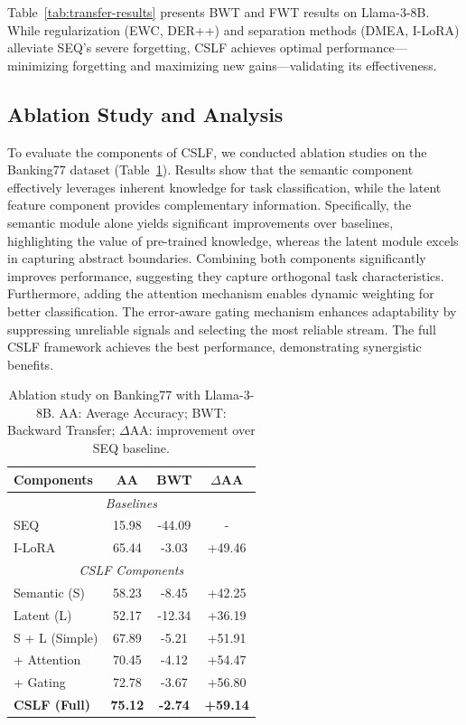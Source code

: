 \documentclass[11pt]{article}
\begin{document}
Table~\ref{tab:transfer-results} presents BWT and FWT results on Llama-3-8B. While regularization (EWC, DER++) and separation methods (DMEA, I-LoRA) alleviate SEQ's severe forgetting, CSLF achieves optimal performance—minimizing forgetting and maximizing new gains—validating its effectiveness.

\subsection{Ablation Study and Analysis}

To evaluate the components of CSLF, we conducted ablation studies on the Banking77 dataset (Table~\ref{tab:ablation}). Results show that the semantic component effectively leverages inherent knowledge for task classification, while the latent feature component provides complementary information. Specifically, the semantic module alone yields significant improvements over baselines, highlighting the value of pre-trained knowledge, whereas the latent module excels in capturing abstract boundaries. Combining both components significantly improves performance, suggesting they capture orthogonal task characteristics. Furthermore, adding the attention mechanism enables dynamic weighting for better classification. The error-aware gating mechanism enhances adaptability by suppressing unreliable signals and selecting the most reliable stream. The full CSLF framework achieves the best performance, demonstrating synergistic benefits.



\begin{table}[ht]
    \centering
    \begin{tabular}{lccc}
        \toprule
        Components & AA  & BWT  & $\Delta$AA \\
        \midrule
        \multicolumn{4}{c}{\textit{Baselines}} \\
        \midrule
        SEQ & 15.98 & -44.09 & - \\
        I-LoRA & 65.44 & -3.03 & +49.46 \\
        \midrule
        \multicolumn{4}{c}{\textit{CSLF Components}} \\
        \midrule
        Semantic (S) & 58.23 & -8.45 & +42.25 \\
        Latent (L) & 52.17 & -12.34 & +36.19 \\
        S + L (Simple) & 67.89 & -5.21 & +51.91 \\
        + Attention & 70.45 & -4.12 & +54.47 \\
        + Gating & 72.78 & -3.67 & +56.80 \\
        \midrule
        \textbf{CSLF (Full)} & \textbf{75.12} & \textbf{-2.74} & \textbf{+59.14} \\
        \bottomrule
    \end{tabular}
    \caption{Ablation study on Banking77 with Llama-3-8B. AA: Average Accuracy; BWT: Backward Transfer; $\Delta$AA: improvement over SEQ baseline.}
    \label{tab:ablation}
\end{table}
\end{document}
